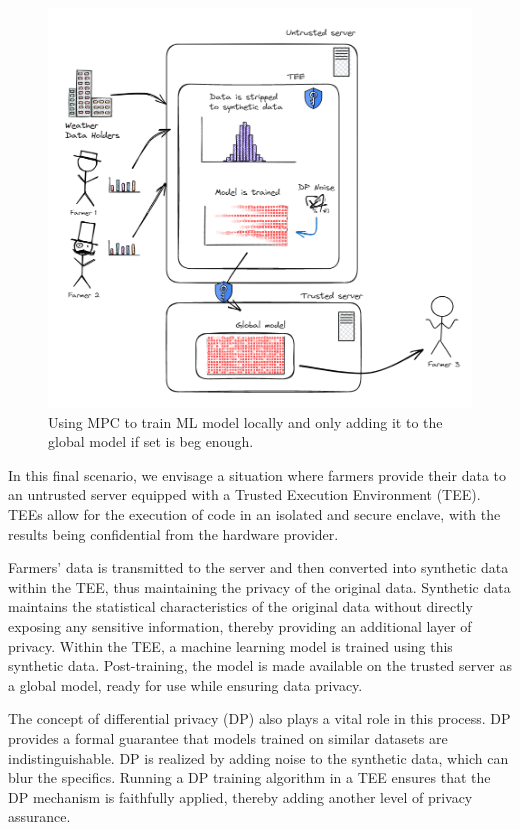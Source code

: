 \begin{figure}[!htbp]
  \centering
  \includegraphics[width=\textwidth]{assets/img_10}
  \caption{Using MPC to train ML model locally and only adding it to the global model if set is beg enough.}
  \label{fig:img_10}
\end{figure}

In this final scenario, we envisage a situation where farmers provide their data to an untrusted server equipped with a Trusted Execution Environment (TEE).
TEEs allow for the execution of code in an isolated and secure enclave, with the results being confidential from the hardware provider.

Farmers' data is transmitted to the server and then converted into synthetic data within the TEE, thus maintaining the privacy of the original data.
Synthetic data maintains the statistical characteristics of the original data without directly exposing any sensitive information, thereby providing an additional layer of privacy.
Within the TEE, a machine learning model is trained using this synthetic data.
Post-training, the model is made available on the trusted server as a global model, ready for use while ensuring data privacy.

The concept of differential privacy (DP) also plays a vital role in this process. DP provides a formal guarantee that models trained on similar datasets are indistinguishable.
DP is realized by adding noise to the synthetic data, which can blur the specifics. Running a DP training
algorithm in a TEE ensures that the DP mechanism is faithfully applied, thereby adding another level of privacy assurance.

